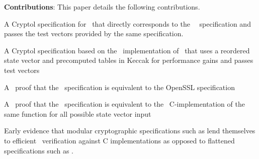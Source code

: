 

\noindent \textbf{Contributions}:
This paper details the following contributions.
\begin{compactitem}
  \item  A Cryptol specification for \shaThree\ that directly corresponds to the \nist\ \fips\ specification and passes the test vectors provided by the same specification.
  \item A Cryptol specification based on the \openssl\ implementation of \shaThree\ that uses a reordered state vector and precomputed tables in Keccak for performance gains and passes test vectors
  \item A \saw\ proof that the \fips\ specification is equivalent to the OpenSSL specification
  \item A \saw\ proof that the \openssl\ \keccak specification is equivalent to the \openssl\ C-implementation of the same function for all possible state vector input
  \item Early evidence that modular cryptographic specifications such as \shaThree lend themselves to efficient \saw\ verification against C implementations as opposed to flattened specifications such as \shaTwo. 
\end{compactitem}

